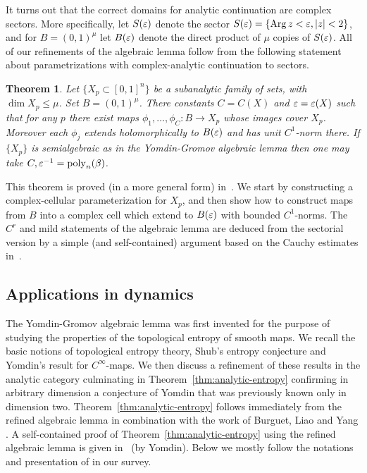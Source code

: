 \documentclass[reqno]{amsart}
\newtheorem{Thm}{Theorem}{\bfseries}{\itshape}
\renewcommand\~[1]{\widetilde{#1}}
\def\Arg{\operatorname{Arg}} \def\dist{\operatorname{dist}}
\def\poly{\operatorname{poly}} \def\J{\operatorname{J}}
\begin{document}
It turns out that the correct domains for analytic continuation are
complex sectors. More specifically, let $S(\varepsilon)$ denote the sector
$S(\e)=\{\Arg z<\e,|z|<2\}$, and for $B=(0,1)^\mu$ let $B(\varepsilon)$ denote
the direct product of $\mu$ copies of $S(\varepsilon)$. All of our refinements
of the algebraic lemma follow from the following statement about
parametrizations with complex-analytic continuation to sectors.

\begin{Thm}
  Let $\{X_p\subset[0,1]^n\}$ be a subanalytic family of sets, with
  $\dim X_p\le\mu$. Set $B=(0,1)^\mu$. There constants $C=C(X)$ and
  $\varepsilon=\varepsilon(X)$ such that for any $p$ there exist maps
  $\phi_1,\ldots,\phi_C:B\to X_p$ whose images cover $X_p$. Moreover
  each $\phi_j$ extends holomorphically to $B(\varepsilon)$ and has unit
  $C^1$-norm there. If $\{X_p\}$ is semialgebraic as in the
  Yomdin-Gromov algebraic lemma then one may take
  $C,\e^{-1}=\poly_n(\beta)$.
\end{Thm}

This theorem is proved (in a more general form)
in~. We start by constructing a
complex-cellular parameterization for $X_p$, and then show how to
construct maps from $B$ into a complex cell which extend to $B(\varepsilon)$
with bounded $C^1$-norms. The $C^r$ and mild statements of the
algebraic lemma are deduced from the sectorial version by a simple
(and self-contained) argument based on the Cauchy estimates
in~.

\subsection{Applications in dynamics}
\label{sec:intro-dynamics}

The Yomdin-Gromov algebraic lemma was first invented for the purpose
of studying the properties of the topological entropy of smooth maps.
We recall the basic notions of topological entropy theory, Shub's
entropy conjecture and Yomdin's result for $C^\infty$-maps. We then
discuss a refinement of these results in the analytic category
culminating in Theorem~\ref{thm:analytic-entropy} confirming in
arbitrary dimension a conjecture of Yomdin that was previously known
only in dimension two. Theorem~\ref{thm:analytic-entropy} follows
immediately from the refined algebraic lemma in combination with the
work of Burguet, Liao and Yang \cite{bly}. A self-contained proof of
Theorem~\ref{thm:analytic-entropy} using the refined algebraic lemma
is given in~ (by Yomdin). Below we mostly
follow the notations and presentation of \cite{bly} in our survey.
\end{document}
